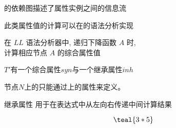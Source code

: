 \begin{frame}{}
  \begin{center}
    的依赖图描述了属性实例之间的信息流

    \vspace{0.80cm}
    此类属性值的计算可以在的语法分析实现

    \pause
    \vspace{0.80cm}
    在 $LL$ 语法分析器中, 递归下降函数 $A$ 时, \\
    计算相应节点 $A$ 的综合属性值
  \end{center}
\end{frame}

\begin{frame}{}
  \begin{center}
    $T'$有一个综合属性$syn$与一个继承属性$inh$


    \begin{definition}
      节点$N$上的只能通过上的属性来定义。
    \end{definition}
  \end{center}
\end{frame}

\begin{frame}{}
  \begin{center}
    继承属性  用于在表达式中从左向右传递中间计算结果

    \vspace{0.50cm}
    \[
        \teal{3 \ast 5}
    \]


    \pause
  \end{center}
\end{frame}

